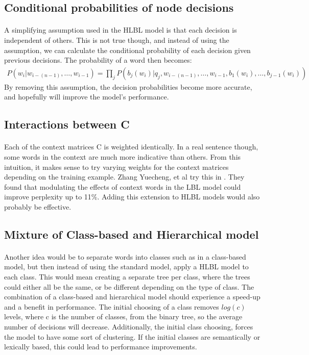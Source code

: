 \subsection{Conditional probabilities of node decisions}
\paragraph{}
A simplifying assumption used in the HLBL model is that each decision is independent of others. This is not true though, and instead of using the assumption, we can calculate the conditional probability of each decision given previous decisions. The probability of a word then becomes:
\begin{align}
P(w_i | w_{i-(n-1)},\dots, w_{i-1})  = \prod_j P(b_j(w_i) | q_j, w_{i-(n-1)},\dots, w_{i-1}, b_1(w_i), \dots, b_{j-1}(w_i))
\end{align}
By removing this assumption, the decision probabilities become more accurate, and hopefully will improve the model's performance.

\subsection{Interactions between C}
\paragraph{}
Each of the context matrices C is weighted identically. In a real sentence though, some words in the context are much more indicative than others. From this intuition, it makes sense to try varying weights for the context matrices depending on the training example. Zhang Yuecheng, et al try this in \cite{Yuecheng2008}. They found that modulating the effects of context words in the LBL model could improve perplexity up to 11\%. Adding this extension to HLBL models would also probably be effective.

\subsection{Mixture of Class-based and Hierarchical model}
\paragraph{}
Another idea would be to separate words into classes such as in a class-based model, but then instead of using the standard model, apply a HLBL model to each class. This would mean creating a separate tree per class, where the trees could either all be the same, or be different depending on the type of class. The combination of a class-based and hierarchical model should experience a speed-up and a benefit in performance. The initial choosing of a class removes $log(c)$ levels, where c is the number of classes, from the binary tree, so the average number of decisions will decrease. Additionally, the initial class choosing, forces the model to have some sort of clustering. If the initial classes are semantically or lexically based, this could lead to performance improvements.


